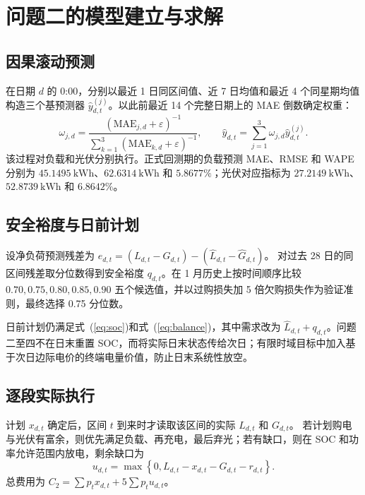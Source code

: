 \section{问题二的模型建立与求解}

\subsection{因果滚动预测}

在日期 $d$ 的 0:00，分别以最近 1 日同区间值、近 7 日均值和最近 4 个同星期均值构造三个基预测器 $\widehat y^{(j)}_{d,t}$。以此前最近 14 个完整日期上的 MAE 倒数确定权重：
\begin{equation}
\omega_{j,d}=\frac{(\mathrm{MAE}_{j,d}+\varepsilon)^{-1}}
{\sum_{k=1}^{3}(\mathrm{MAE}_{k,d}+\varepsilon)^{-1}},\qquad
\widehat y_{d,t}=\sum_{j=1}^{3}\omega_{j,d}\widehat y^{(j)}_{d,t}.
\end{equation}
该过程对负载和光伏分别执行。正式回测期的负载预测 MAE、RMSE 和 WAPE 分别为
$45.1495~\mathrm{kWh}$、$62.6314~\mathrm{kWh}$ 和 $5.8677\%$；光伏对应指标为
$27.2149~\mathrm{kWh}$、$52.8739~\mathrm{kWh}$ 和 $6.8642\%$。

\subsection{安全裕度与日前计划}

设净负荷预测残差为
$e_{d,t}=(L_{d,t}-G_{d,t})-(\widehat L_{d,t}-\widehat G_{d,t})$。
对过去 28 日的同区间残差取分位数得到安全裕度 $q_{d,t}$。在 1 月历史上按时间顺序比较
$0.70,0.75,0.80,0.85,0.90$ 五个候选值，并以过购损失加 5 倍欠购损失作为验证准则，最终选择 0.75 分位数。

日前计划仍满足式~(\ref{eq:soc})和式~(\ref{eq:balance})，其中需求改为
$\widehat L_{d,t}+q_{d,t}$。问题二至四不在日末重置 SOC，而将实际日末状态传给次日；有限时域目标中加入基于次日边际电价的终端电量价值，防止日末系统性放空。

\subsection{逐段实际执行}

计划 $x_{d,t}$ 确定后，区间 $t$ 到来时才读取该区间的实际 $L_{d,t}$ 和 $G_{d,t}$。
若计划购电与光伏有富余，则优先满足负载、再充电，最后弃光；若有缺口，则在 SOC 和功率允许范围内放电，剩余缺口为
\begin{equation}
u_{d,t}=\max\left\{0,L_{d,t}-x_{d,t}-G_{d,t}-r_{d,t}\right\}.
\end{equation}
总费用为 $C_2=\sum p_tx_{d,t}+5\sum p_tu_{d,t}$。

